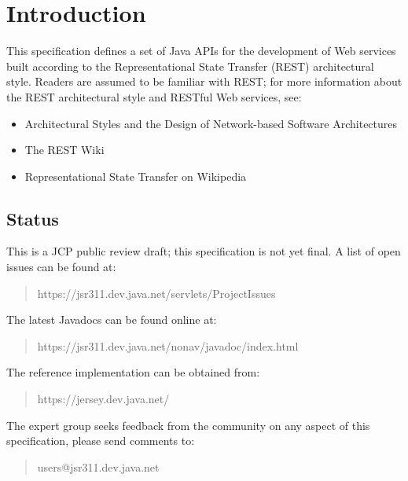 \chapter{Introduction}

This specification defines a set of Java APIs for the development of Web services built according to the Representational State Transfer\cite{rest} (REST) architectural style. Readers are assumed to be familiar with 
REST; for more information about the REST architectural style and RESTful Web services, see:

\begin{itemize}
\item Architectural Styles and the Design of Network-based Software Architectures\cite{rest}
\item The REST Wiki\cite{restwiki}
\item Representational State Transfer on Wikipedia\cite{restwikipedia}
\end{itemize}

\section{Status}

This is a JCP public review draft; this specification is not yet final. A list of open issues can be found at:

\begin{quote}
https://jsr311.dev.java.net/servlets/ProjectIssues
\end{quote}

The latest Javadocs can be found online at:

\begin{quote}
https://jsr311.dev.java.net/nonav/javadoc/index.html
\end{quote}

The reference implementation can be obtained from:

\begin{quote}
https://jersey.dev.java.net/
\end{quote}

The expert group seeks feedback from the community on any aspect of this specification, please send comments to:

\begin{quote}
users@jsr311.dev.java.net
\end{quote}

